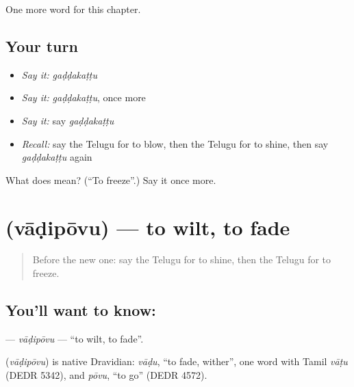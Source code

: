 \begin{grammarlens}[title={What you've built}]
One more word for this chapter.
\end{grammarlens}

\subsection*{Your turn}
\begin{itemize}
\raggedright
  \item \emph{Say it:} \emph{gaḍḍakaṭṭu}
  \item \emph{Say it:} \emph{gaḍḍakaṭṭu}, once more
  \item \emph{Say it:} say \emph{gaḍḍakaṭṭu}
  \item \emph{Recall:} say the Telugu for to blow, then the Telugu for to shine, then say \emph{gaḍḍakaṭṭu} again
\end{itemize}

\begin{tcolorbox}[breakable,colback=teal!4,colframe=teal!35!black,title={Before you move on}]
What does  mean? (\textquotedblleft{}To freeze\textquotedblright{}.) Say it once more.
\end{tcolorbox}
\section[\texorpdfstring{\te{వాడిపోవు} (vāḍipōvu)}{వాడిపోవు (vāḍipōvu)}]{ (vāḍipōvu) — to wilt, to fade}

\label{lesson:TE-C244-vadipovu}



\begin{quote}
Before the new one: say the Telugu for to shine, then the Telugu for to freeze.
\end{quote}

\subsection*{You'll want to know: }
\textbf{} — \emph{vāḍipōvu} — \textquotedblleft{}to wilt, to fade\textquotedblright{}.

\begin{cousinweb}
\textbf{} (\emph{vāḍipōvu}) is native Dravidian: \emph{vāḍu}, \textquotedblleft{}to fade, wither\textquotedblright{}, one word with Tamil \emph{vāṭu} (DEDR 5342), and \emph{pōvu}, \textquotedblleft{}to go\textquotedblright{} (DEDR 4572).
\end{cousinweb}

